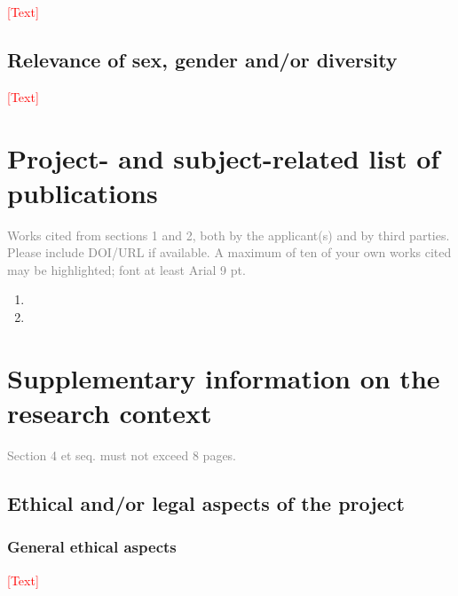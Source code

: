 \documentclass[a4paper,11pt]{article}
\begin{document}
\noindent\textcolor{red}{[Text]}

\subsection{Relevance of sex, gender and/or diversity}

\noindent\textcolor{red}{[Text]}

\section{Project- and subject-related list of publications}

\textcolor{gray}{Works cited from sections 1 and 2, both by the applicant(s) and by third parties.
Please include DOI/URL if available. A maximum of ten of your own works cited may be highlighted; font at least Arial 9 pt.}

\begin{enumerate}
  \item {}
  \item {}
\end{enumerate}

\section{Supplementary information on the research context}

\textcolor{gray}{Section 4 et seq. must not exceed 8 pages.}

\subsection{Ethical and/or legal aspects of the project}

\subsubsection{General ethical aspects}

\noindent\textcolor{red}{[Text]}



\end{document}
